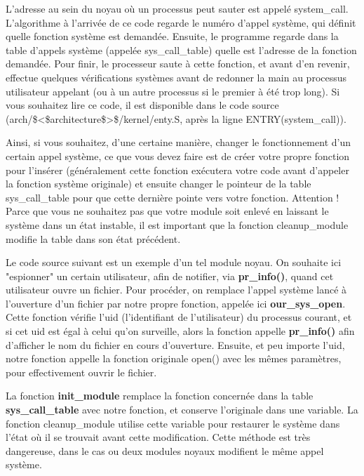 \documentclass[11pt]{article}
\begin{document}
L'adresse au sein du noyau où un processus peut sauter est appelé system\_call. L'algorithme à l'arrivée de ce code regarde le numéro d'appel système, qui définit quelle fonction système est demandée. Ensuite, le programme regarde dans la table d'appels système (appelée sys\_call\_table) quelle est l'adresse de la fonction demandée. Pour finir, le processeur saute à cette fonction, et avant d'en revenir, effectue quelques vérifications systèmes avant de redonner la main au processus utilisateur appelant (ou à un autre processus si le premier à été trop long). Si vous souhaitez lire ce code, il est disponible dans le code source (arch/\$<\$architecture\$>\$/kernel/enty.S, après la ligne ENTRY(system\_call)).

Ainsi, si vous souhaitez, d'une certaine manière, changer le fonctionnement d'un certain appel système, ce que vous devez faire est de créer votre propre fonction pour l'insérer (généralement cette fonction exécutera votre code avant d'appeler la fonction système originale) et ensuite changer le pointeur de la table sys\_call\_table pour que cette dernière pointe vers votre fonction. Attention ! Parce que vous ne souhaitez pas que votre module soit enlevé en laissant le système dans un état instable, il est important que la fonction cleanup\_module modifie la table dans son état précédent.

Le code source suivant est un exemple d'un tel module noyau. On souhaite ici "espionner" un certain utilisateur, afin de notifier, via \textbf{pr\_info()}, quand cet utilisateur ouvre un fichier. Pour procéder, on remplace l'appel système lancé à l'ouverture d'un fichier par notre propre fonction, appelée ici \textbf{our\_sys\_open}. Cette fonction vérifie l'uid (l'identifiant de l'utilisateur) du processus courant, et si cet uid est égal à celui qu'on surveille, alors la fonction appelle \textbf{pr\_info()} afin d'afficher le nom du fichier en cours d'ouverture. Ensuite, et peu importe l'uid, notre fonction appelle la fonction originale open() avec les mêmes paramètres, pour effectivement ouvrir le fichier.

La fonction \textbf{init\_module} remplace la fonction concernée dans la table \textbf{sys\_call\_table} avec notre fonction, et conserve l'originale dans une variable. La fonction cleanup\_module utilise cette variable pour restaurer le système dans l'état où il se trouvait avant cette modification. Cette méthode est très dangereuse, dans le cas ou deux modules noyaux modifient le même appel système.
\end{document}
